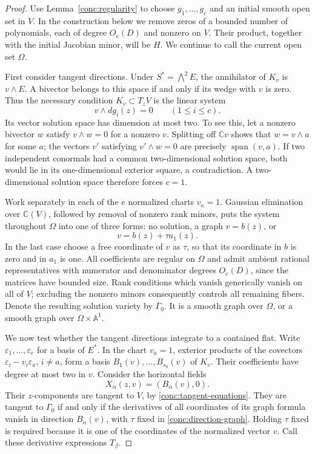 \begin{proof}
Use Lemma~\ref{conc:regularity} to choose $g_1,\ldots,g_c$ and an
initial smooth open set in $V$.  In the construction below we remove
zeros of a bounded number of polynomials, each of degree $O_e(D)$ and
nonzero on $V$.  Their product, together with the initial Jacobian
minor, will be $H$.  We continue to call the current open set $\Omega$.

First consider tangent directions.  Under $S^*=\bigwedge^2E$, the
annihilator of $K_v$ is $v\wedge E$.  A bivector belongs to this space
if and only if its wedge with $v$ is zero.  Thus the necessary
condition $K_v\subset T_zV$ is the linear system
\begin{equation}
 v\wedge dg_i(z)=0\qquad(1\leq i\leq c).
 \label{conc:tangent-equations}
\end{equation}
Its vector solution space has dimension at most two.  To see this,
let a nonzero bivector $w$ satisfy $v\wedge w=0$ for a nonzero $v$.
Splitting off $\mathbb Cv$ shows that $w=v\wedge a$ for some $a$;
the vectors $v'$ satisfying $v'\wedge w=0$ are precisely
$\operatorname{span}(v,a)$.  If two independent conormals had a common
two-dimensional solution space, both would lie in its one-dimensional
exterior square, a contradiction.  A two-dimensional solution space
therefore forces $c=1$.

Work separately in each of the $e$ normalized charts $v_a=1$.
Gaussian elimination over $\mathbb C(V)$, followed by removal of
nonzero rank minors, puts the system throughout $\Omega$ into one of
three forms: no solution, a graph $v=b(z)$, or
\begin{equation}
 v=b(z)+\tau a_1(z).
 \label{conc:direction-graph}
\end{equation}
In the last case choose a free coordinate of $v$ as $\tau$, so that
its coordinate in $b$ is zero and in $a_1$ is one.  All coefficients
are regular on $\Omega$ and admit ambient rational representatives
with numerator and denominator degrees $O_e(D)$, since the matrices
have bounded size.  Rank conditions which vanish generically vanish
on all of $V$; excluding the nonzero minors consequently controls all
remaining fibers.  Denote the resulting solution variety by $\Gamma_0$.
It is a smooth graph over $\Omega$, or a smooth graph over
$\Omega\times\mathbb A^1$.

We now test whether the tangent directions integrate to a contained
flat.  Write $\varepsilon_1,\ldots,\varepsilon_e$ for a basis of $E^*$.
In the chart $v_a=1$, exterior products of the covectors
$\varepsilon_i-v_i\varepsilon_a$, $i\ne a$, form a basis
$B_1(v),\ldots,B_{s_0}(v)$ of $K_v$.  Their coefficients have degree
at most two in $v$.  Consider the horizontal fields
\[
 X_\alpha(z,v)=(B_\alpha(v),0).
\]
Their $z$-components are tangent to $V$, by
\eqref{conc:tangent-equations}.  They are tangent to $\Gamma_0$ if and
only if the derivatives of all coordinates of its graph formula
vanish in direction $B_\alpha(v)$, with $\tau$ fixed in
\eqref{conc:direction-graph}.  Holding $\tau$ fixed is required
because it is one of the coordinates of the normalized vector $v$.
Call these derivative expressions $T_\beta$.


\end{proof}
